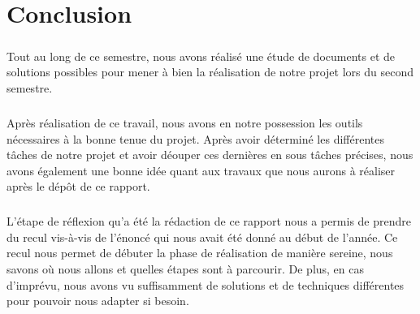 \chapter*{Conclusion}

\paragraph{}
Tout au long de ce semestre, nous avons réalisé une étude de documents et de solutions possibles pour mener à bien la réalisation de notre projet lors du second semestre.

\paragraph{}
Après réalisation de ce travail, nous avons en notre possession les outils nécessaires à la bonne tenue du projet. Après avoir déterminé les différentes tâches de notre projet et avoir déouper ces dernières en sous tâches précises, nous avons également une bonne idée quant aux travaux que nous aurons à réaliser après le dépôt de ce rapport. 

\paragraph{}
L'étape de réflexion qu'a été la rédaction de ce rapport nous a permis de prendre du recul vis-à-vis de l'énoncé qui nous avait été donné au début de l'année. Ce recul nous permet de débuter la phase de réalisation de manière sereine, nous savons où nous allons et quelles étapes sont à parcourir. De plus, en cas d'imprévu, nous avons vu suffisamment de solutions et de techniques différentes pour pouvoir nous adapter si besoin.

\paragraph{}

